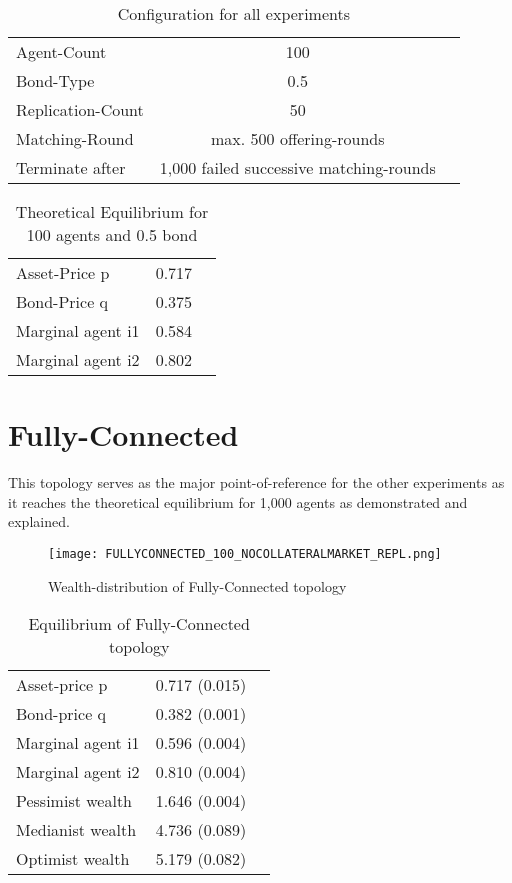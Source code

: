 \documentclass[Bachelorarbeit.tex]{subfiles}
\begin{document}
\begin{table}[H]
	\centering
	\caption{Configuration for all experiments}
	\begin{tabular} { l c r }
		\hline
		Agent-Count & 100 \\
		Bond-Type & 0.5 \\
		Replication-Count & 50 \\
		Matching-Round & max. 500 offering-rounds \\
		Terminate after & 1,000 failed successive matching-rounds \\
		\hline
	\end{tabular}
\end{table}

\begin{table}[H]
	\centering
	\caption{Theoretical Equilibrium for 100 agents and 0.5 bond}
	\begin{tabular} { l c r }
		\hline
		Asset-Price p & 0.717 \\
		Bond-Price q & 0.375 \\
		Marginal agent i1 & 0.584 \\
		Marginal agent i2 & 0.802 \\
		\hline
	\end{tabular}
	\label{tab:theoretical_equilibrium_100Agents_05Bond}
\end{table}

\section{Fully-Connected}
This topology serves as the major point-of-reference for the other experiments as it reaches the theoretical equilibrium for 1,000 agents as demonstrated and explained.

\begin{figure}[H]
	\centering
  \texttt{[image: FULLYCONNECTED\_100\_NOCOLLATERALMARKET\_REPL.png]}
	\caption{Wealth-distribution of Fully-Connected topology}
	\label{fig:wealth_FULLYCONNECTED_100_NOCOLLATERALMARKET_REPL}
\end{figure}

\begin{table}[H]
	\caption{Equilibrium of Fully-Connected topology}
	\centering
	\begin{tabular} { l c r }
		\hline
		Asset-price p & 0.717 (0.015) \\
		Bond-price q & 0.382 (0.001) \\
		Marginal agent i1 & 0.596 (0.004) \\
		Marginal agent i2 & 0.810 (0.004) \\
		\hline
		Pessimist wealth & 1.646 (0.004) \\
		Medianist wealth & 4.736 (0.089) \\
		Optimist wealth & 5.179 (0.082) \\
		\hline
	\end{tabular}
	\label{tab:fullyconnected_equilibrium_100Agents_05Bond}
\end{table} 
\end{document}
